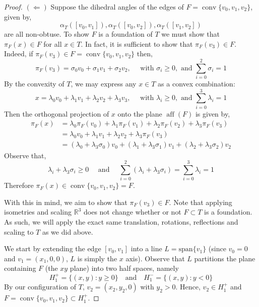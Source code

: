 \documentclass[10pt,a4paper]{amsart}
\begin{document}
\begin{proof}
	
	$(\Leftarrow)$ Suppose the dihedral angles of the edges of $F=\operatorname{conv}\{v_0,v_1,v_2\}$, given by, 
	\[
	\alpha_T([v_0,v_1]),\alpha_T([v_0,v_2]),\alpha_T([v_1,v_2])
	\]
	are all non-obtuse. To show $F$ is a foundation of $T$ we must show that $\pi_F(x) \in F$ for all $x\in T$. In fact, it is sufficient to show that $\pi_F(v_3)\in F$. Indeed, if $\pi_F(v_3) \in F = \operatorname{conv}\{v_0,v_1,v_2\}$ then, 
	\begin{equation*}
		\pi_F(v_3) = \sigma_0v_0+\sigma_1v_1+\sigma_2v_2 ,  \quad \text{ with } \sigma_i \ge 0 , \text{ and } \sum^2_{i=0} \sigma_i = 1
	\end{equation*}
	By the convexity of $T$, we may express any $x\in T$ as a convex combination:
	\begin{equation*}
		x = \lambda_0v_0+\lambda_1v_1+\lambda_2v_2+\lambda_3v_3 ,  \quad \text{ with } \lambda_i \ge 0 , \text{ and } \sum^3_{i=0} \lambda_i = 1
	\end{equation*}
	Then the orthogonal projection of $x$ onto the plane $\operatorname{aff}(F)$ is given by,
	\begin{align*}
		\pi_F(x) &= \lambda_0\pi_F(v_0)+\lambda_1\pi_F(v_1) +\lambda_2\pi_F(v_2)+\lambda_3 \pi_F(v_3) \\
		&= \lambda_0v_0+\lambda_1v_1+\lambda_2v_2 +\lambda_3 \pi_F(v_3)\\
		&= (\lambda_0 + \lambda_3\sigma_0 )v_0+(\lambda_1+\lambda_3\sigma_1)v_1+(\lambda_2 + \lambda_3\sigma_2) v_2 
	\end{align*}
	Observe that,
	\[
	\lambda_i+\lambda_3\sigma_i \ge 0 \quad \text{ and } \quad \sum_{i=0}^2(\lambda_i+\lambda_3\sigma_i) = \sum_{i=0}^3\lambda_i=1
	\]
	Therefore $\pi_F(x)\in \operatorname{conv}\{v_0,v_1,v_2\} = F$.
	
	With this in mind, we aim to show that $\pi_F(v_3) \in F$. Note that applying isometries and scaling $\mathbb{R}^3$ does not change whether or not $F\subset T$ is a foundation. As such, we will apply the exact same translation, rotations, reflections and scaling to $T$ as we did above.
	
	We start by extending the edge $[v_0,v_1]$ into a line $L=\mathrm{span}\{v_1\}$ (since $v_0 = 0$ and $v_1=(x_1,0,0)$, $L$ is simply the  $x$ axis). Observe that $L$ partitions the plane containing $F$ (the $xy$ plane) into two half spaces, namely
	\begin{equation*}
		H_1^+=\{(x,y):y\geq0\} \quad \text{and} \quad  H_1^-=\{(x,y):y<0\}
	\end{equation*}
	By our configuration of $T$, $v_2 = (x_2,y_2,0)$ with $y_2>0$. Hence, $v_2\in H_1^+$ and $F=\operatorname{conv}\{v_0,v_1,v_2\}\subset H_1^+$. 
	

\end{proof}
\end{document}
